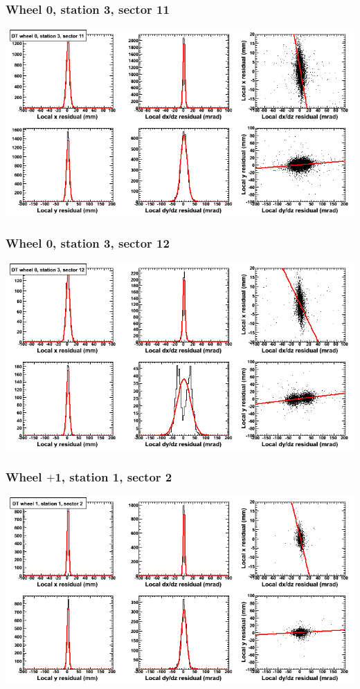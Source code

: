 \documentclass[compress]{beamer}
\begin{document}
\begin{frame}
\frametitle{Wheel 0, station 3, sector 11}
\includegraphics[width=\linewidth]{tmpbell_MBwhCst3sec11.png}
\end{frame}

\begin{frame}
\frametitle{Wheel 0, station 3, sector 12}
\includegraphics[width=\linewidth]{tmpbell_MBwhCst3sec12.png}
\end{frame}

\begin{frame}
\frametitle{Wheel $+$1, station 1, sector 2}
\includegraphics[width=\linewidth]{tmpbell_MBwhDst1sec02.png}
\end{frame}
\end{document}
